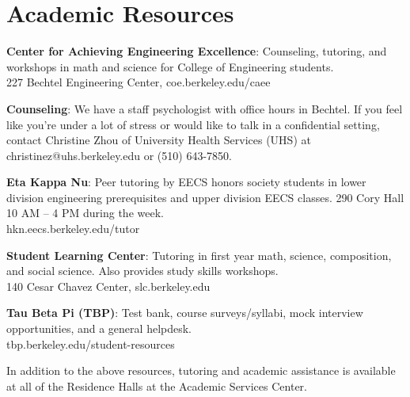 \chapter*{Academic Resources}

\textbf{Center for Achieving Engineering Excellence}: Counseling, tutoring, and workshops in math and science for College of Engineering students. \\
227 Bechtel Engineering Center, {\selectfont coe.berkeley.edu/caee} 

\textbf{Counseling}: We have a staff psychologist with office hours in Bechtel. If you feel like you’re under a lot of stress or would like to talk in a confidential setting, contact Christine Zhou of University Health Services (UHS) at {\selectfont christinez@uhs.berkeley.edu} or (510) 643-7850.

\textbf{Eta Kappa Nu}: Peer tutoring by EECS honors society students in lower division engineering prerequisites and upper division EECS classes. 290 Cory Hall 10 AM – 4 PM during the week. \\
{\selectfont hkn.eecs.berkeley.edu/tutor} 

\textbf{Student Learning Center}: Tutoring in first year math, science, composition, and social science. Also provides study skills workshops. \\
140 Cesar Chavez Center, {\selectfont slc.berkeley.edu}

\textbf{Tau Beta Pi (TBP)}: Test bank, course surveys/syllabi, mock interview opportunities, and a general helpdesk. \\
{\selectfont tbp.berkeley.edu/student-resources}

In addition to the above resources, tutoring and academic assistance is available at all of the Residence Halls at the Academic Services Center.

